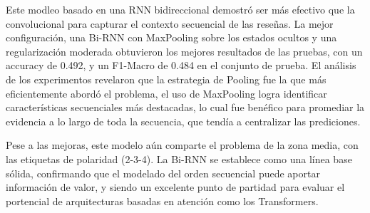 Este modleo basado en una RNN bidireccional demostró ser más efectivo que la convolucional para capturar
el contexto secuencial de las reseñas. La mejor configuración, una Bi-RNN con MaxPooling sobre los 
estados ocultos y una regularización moderada obtuvieron los mejores resultados de las pruebas, con un
accuracy de 0.492, y un F1-Macro de 0.484 en el conjunto de prueba. El análisis de los experimentos
revelaron que la estrategia de Pooling fue la que más eficientemente abordó el problema, el uso de 
MaxPooling logra identificar características secuenciales más destacadas, lo cual fue benéfico para
promediar la evidencia a lo largo de toda la secuencia, que tendía a centralizar las prediciones. 

Pese a las mejoras, este modelo aún comparte el problema de la zona media, con las etiquetas de polaridad
(2-3-4). La Bi-RNN se establece como una línea base sólida, confirmando que el modelado del 
orden secuencial puede aportar información de valor, y siendo un excelente punto de partidad para evaluar
el portencial de arquitecturas basadas en atención como los Transformers. 








\clearpage